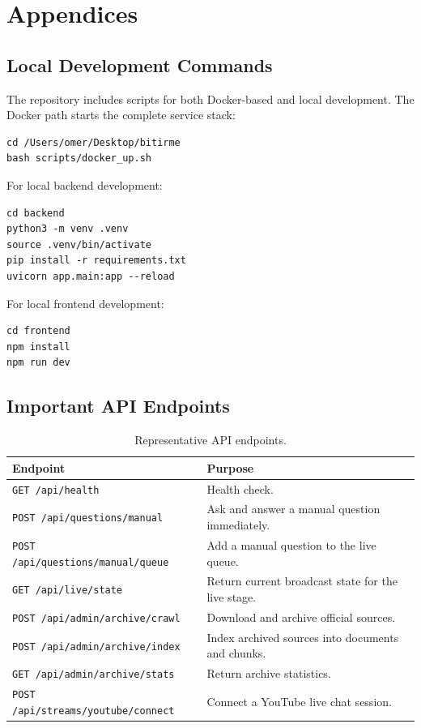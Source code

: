 \chapter{Appendices}

\section{Local Development Commands}

The repository includes scripts for both Docker-based and local development. The Docker path starts the complete service stack:

\begin{verbatim}
cd /Users/omer/Desktop/bitirme
bash scripts/docker_up.sh
\end{verbatim}

For local backend development:

\begin{verbatim}
cd backend
python3 -m venv .venv
source .venv/bin/activate
pip install -r requirements.txt
uvicorn app.main:app --reload
\end{verbatim}

For local frontend development:

\begin{verbatim}
cd frontend
npm install
npm run dev
\end{verbatim}

\section{Important API Endpoints}

\begin{table}[!htbp]
    \centering
    \caption{\label{tab:api-endpoints}Representative API endpoints.}
    \begin{tabularx}{\textwidth}{lX}
        \toprule
        Endpoint & Purpose \\
        \midrule
        \texttt{GET /api/health} & Health check. \\
        \texttt{POST /api/questions/manual} & Ask and answer a manual question immediately. \\
        \texttt{POST /api/questions/manual/queue} & Add a manual question to the live queue. \\
        \texttt{GET /api/live/state} & Return current broadcast state for the live stage. \\
        \texttt{POST /api/admin/archive/crawl} & Download and archive official sources. \\
        \texttt{POST /api/admin/archive/index} & Index archived sources into documents and chunks. \\
        \texttt{GET /api/admin/archive/stats} & Return archive statistics. \\
        \texttt{POST /api/streams/youtube/connect} & Connect a YouTube live chat session. \\
        \bottomrule
    \end{tabularx}
\end{table}

